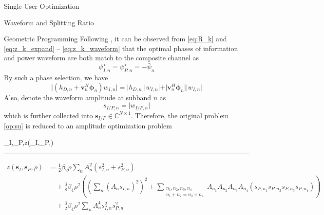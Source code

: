 \documentclass{IEEEtran}
\begin{document}
\begin{section}{Single-User Optimization}
	\begin{subsection}{Waveform and Splitting Ratio}
		\begin{subsubsection}{Geometric Programming}
			Following \cite{Clerckx2018b}, it can be observed from \ref{eq:R_k} and \ref{eq:z_k_expand} -- \ref{eq:z_k_waveform} that the optimal phases of information and power waveform are both match to the composite channel as
			\begin{equation}\label{eq:psi}
				\psi_{I,n}^{\star}=\psi_{P,n}^{\star}=-\bar{\psi}_{n}
			\end{equation}
			By such a phase selection, we have
			\begin{equation}
				\lvert{(h_{D,n}+\boldsymbol{v}_n^H\boldsymbol{\phi}_n)w_{I,n}}\rvert = \lvert h_{D,n} \rvert \lvert w_{I,n} \rvert + \vert \boldsymbol{v}_n^H\boldsymbol{\phi}_n \rvert \lvert w_{I,n} \rvert
			\end{equation}
			Also, denote the waveform amplitude at subband $n$ as
			\begin{equation}\label{eq:s}
				s_{I/P,n} = \lvert w_{I/P,n} \rvert
			\end{equation}
			which is further collected into $\boldsymbol{s}_{I/P} \in \mathbb{C}^{N \times 1}$. Therefore, the original problem \ref{op:su} is reduced to an amplitude optimization problem
			\begin{maxi!}
					{\boldsymbol{s}_I,_P,\rho}{z(_I,_P,\rho)}{\label{op:su_gp}}{}
				\end{maxi!}
			\begin{figure*}[b]
				\hrule
				\begin{equation}\label{eq:z_gp}
					\begin{split}
						z(\boldsymbol{s}_I,\boldsymbol{s}_P,\rho)
						&=\frac{1}{2}{\beta_2}{\rho}\sum_n{A_n^2(s_{I,n}^2+s_{P,n}^2)}\\
						&\quad+\frac{3}{8}{\beta_4}{\rho^2} \left(\left(\sum_{n}(A_n s_{I,n})^2\right)^2 + \sum_{\substack{{n_1},{n_2},{n_3},{n_4}\\{n_1}+{n_2}={n_3}+{n_4}}}{A_{n_1}A_{n_2}A_{n_3}A_{n_4}(s_{P,n_1}s_{P,n_2}s_{P,n_3}s_{P,n_4})}\right)\\
						&\quad+\frac{3}{2}{\beta_4}{\rho^2}\sum_n{{A_n^4}{s_{I,n}^2}{s_{P,n}^2}}
					\end{split}

\end{equation}
\end{figure*}
\end{subsubsection}
\end{subsection}
\end{section}
\end{document}
